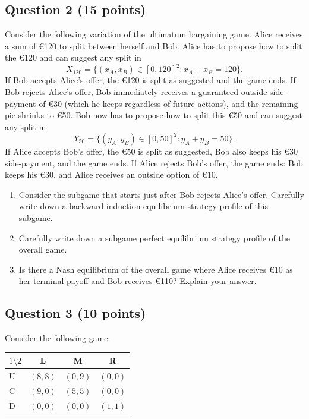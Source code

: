 \documentclass[12pt,a4paper]{article}
\begin{document}
\subsection*{Question 2 (15 points)}

Consider the following variation of the ultimatum bargaining game. Alice receives a sum of €120 to split between herself and Bob. Alice has to propose how to split the €120 and can suggest any split in
\[
  X_{120} = \{(x_A, x_B) \in [0,120]^2 : x_A + x_B = 120\}.
\]
If Bob accepts Alice's offer, the €120 is split as suggested and the game ends. If Bob rejects Alice's offer, Bob immediately receives a guaranteed outside side-payment of €30 (which he keeps regardless of future actions), and the remaining pie shrinks to €50. Bob now has to propose how to split this €50 and can suggest any split in
\[
  Y_{50} = \{(y_A, y_B) \in [0,50]^2 : y_A + y_B = 50\}.
\]
If Alice accepts Bob's offer, the €50 is split as suggested, Bob also keeps his €30 side-payment, and the game ends. If Alice rejects Bob's offer, the game ends: Bob keeps his €30, and Alice receives an outside option of €10.

\begin{enumerate}
  \item Consider the subgame that starts just after Bob rejects Alice's offer. Carefully write down a backward induction equilibrium strategy profile of this subgame.
  \item Carefully write down a subgame perfect equilibrium strategy profile of the overall game.
  \item Is there a Nash equilibrium of the overall game where Alice receives €10 as her terminal payoff and Bob receives €110? Explain your answer.
\end{enumerate}

\subsection*{Question 3 (10 points)}

Consider the following game:

\begin{table}[h!]
  \centering
  \renewcommand{\arraystretch}{1.1}
  \begin{tabular}{lccc}
    \toprule
    $1 \setminus 2$ & L & M & R \\
    \midrule
    U & $(8,8)$ & $(0,9)$ & $(0,0)$ \\
    C & $(9,0)$ & $(5,5)$ & $(0,0)$ \\
    D & $(0,0)$ & $(0,0)$ & $(1,1)$ \\
    \bottomrule
  \end{tabular}
\end{table}
\end{document}
